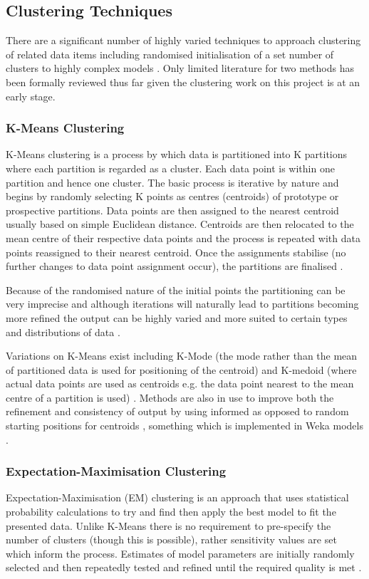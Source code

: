 \subsection{Clustering Techniques}

There are a significant number of highly varied techniques to approach clustering of related data items including randomised initialisation of a set number of clusters to highly complex models \citep{hongbo2010data,rogers2011first}. Only limited literature for two methods has been formally reviewed thus far given the clustering work on this project is at an early stage.

\subsubsection{K-Means Clustering}

K-Means clustering is a process by which data is partitioned into K partitions where each partition is regarded as a cluster. Each data point is within one partition and hence one cluster. The basic process is iterative by nature and begins by randomly selecting K points as centres (centroids) of prototype or prospective partitions. Data points are then assigned to the nearest centroid usually based on simple Euclidean distance. Centroids are then relocated to the mean centre of their respective data points and the process is repeated with data points reassigned to their nearest centroid. Once the assignments stabilise (no further changes to data point assignment occur), the partitions are finalised \citep{hongbo2010data}.

Because of the randomised nature of the initial points the partitioning can be very imprecise and although iterations will naturally lead to partitions becoming more refined the output can be highly varied and more suited to certain types and distributions of data \citep{hongbo2010data,rogers2011first}.

Variations on K-Means exist including K-Mode (the mode rather than the mean of partitioned data is used for positioning of the centroid) and K-medoid (where actual data points are used as centroids e.g. the data point nearest to the mean centre of a partition is used) \citep{hongbo2010data}. Methods are also in use to improve both the refinement and consistency of output by using informed as opposed to random starting positions for centroids \citep{rogers2011first}, something which is implemented in Weka models \citep{hongbo2010data}.

\subsubsection{Expectation-Maximisation Clustering}

Expectation-Maximisation (EM) clustering is an approach that uses statistical probability calculations to try and find then apply the best model to fit the presented data. Unlike K-Means there is no requirement to pre-specify the number of clusters (though this is possible), rather sensitivity values are set which inform the process. Estimates of model parameters are initially randomly selected and then repeatedly tested and refined until the required quality is met \citep{hongbo2010data}.
